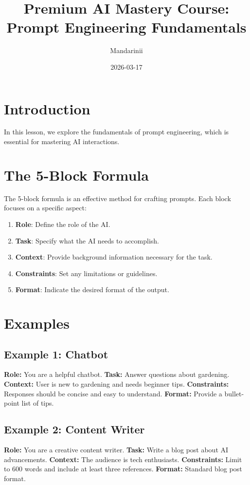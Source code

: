 \documentclass{article}
\title{Premium AI Mastery Course: Prompt Engineering Fundamentals}
\author{Mandarinii}
\date{2026-03-17}
\begin{document}
\maketitle
\section{Introduction}
In this lesson, we explore the fundamentals of prompt engineering, which is essential for mastering AI interactions.
\section{The 5-Block Formula}
The 5-block formula is an effective method for crafting prompts. Each block focuses on a specific aspect:
\begin{enumerate}
    \item \textbf{Role}: Define the role of the AI.
    \item \textbf{Task}: Specify what the AI needs to accomplish.
    \item \textbf{Context}: Provide background information necessary for the task.
    \item \textbf{Constraints}: Set any limitations or guidelines.
    \item \textbf{Format}: Indicate the desired format of the output.
\end{enumerate}
\section{Examples}
\subsection{Example 1: Chatbot}
\textbf{Role:} You are a helpful chatbot.\newline
\textbf{Task:} Answer questions about gardening.\newline
\textbf{Context:} User is new to gardening and needs beginner tips.\newline
\textbf{Constraints:} Responses should be concise and easy to understand.\newline
\textbf{Format:} Provide a bullet-point list of tips.
\subsection{Example 2: Content Writer}
\textbf{Role:} You are a creative content writer.\newline
\textbf{Task:} Write a blog post about AI advancements.\newline
\textbf{Context:} The audience is tech enthusiasts.\newline
\textbf{Constraints:} Limit to 600 words and include at least three references.\newline
\textbf{Format:} Standard blog post format.
\end{document}
